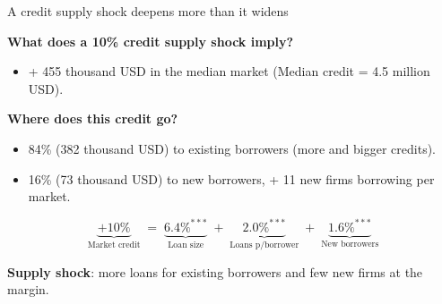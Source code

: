 \documentclass[aspectratio=169]{beamer}
\begin{document}
\begin{frame}{A credit supply shock deepens more than it widens}

\textbf{What does a 10\% credit supply shock imply?}

\begin{itemize}
    \item + 455 thousand USD in the median market (Median credit = 4.5 million USD).
\end{itemize}

\pause
\vspace{5mm}

\textbf{Where does this credit go?}

\begin{itemize}
    \item 84\% (382 thousand USD) to existing borrowers (more and bigger credits).
    \item 16\% (73 thousand USD) to new borrowers, + 11 new firms borrowing per market. 
\end{itemize}

\[
\underbrace{+10\%}_{\text{Market credit}} \;=\; \underbrace{6.4\%^{***}}_{\text{Loan size}} \;+\;
\underbrace{2.0\%^{***}}_{\text{Loans p/borrower}} \;+\;
\underbrace{1.6\%^{***}}_{\text{New borrowers}} 
\]

\vspace{5mm}

\begin{center}
    \large \textbf{Supply shock}: more loans for existing borrowers and few new firms at the margin.
\end{center}
\end{frame}

\end{document}
